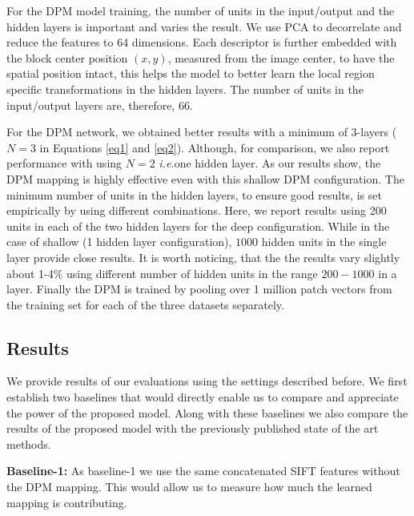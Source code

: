 \documentclass[smallextended,natbib]{svjour3}       \usepackage{graphicx}
\newcommand{\ie}{\emph{i.e.}}
\begin{document}
For the DPM model training, the number of units in the input/output and the hidden layers is important and varies the result. We use PCA to decorrelate and reduce the features to 64 dimensions. Each descriptor is further embedded with the block center position $(x,y)$, measured from the image center, to have the spatial position intact, this helps the model to better learn the local region specific transformations in the hidden layers. The number of units in the input/output layers are, therefore, $66$.

For the DPM network, we obtained better results with a minimum of 3-layers ($N=3$ in Equations \ref{eq1} and \ref{eq2}). Although, for comparison, we also report performance with using $N=2$ \ie one hidden layer. As our results show, the DPM mapping is highly effective even with this shallow DPM configuration. The minimum number of units in the hidden layers,  to ensure good results, is set empirically by using different combinations. Here, we report results using 200 units in each of the two hidden layers for the deep configuration. While in the case of shallow (1 hidden layer configuration), $1000$ hidden units in the single layer provide close results. It is worth noticing, that the the results vary slightly about 1-4\% using different number of hidden units in the range $200-1000$ in a layer. Finally the DPM is trained by pooling over 1 million patch vectors from the training set for each of the three datasets separately.
\subsection{Results}
We provide results of our evaluations using the settings described before. We first establish two baselines that would directly enable us to compare and appreciate the power of the proposed model. Along with these baselines we also compare the results of the proposed model with the previously published state of the art methods.
  
\noindent\textbf{Baseline-1:} As baseline-1 we use the same concatenated SIFT features without the DPM mapping. This would allow us to measure how much the learned mapping is contributing.
\end{document}

